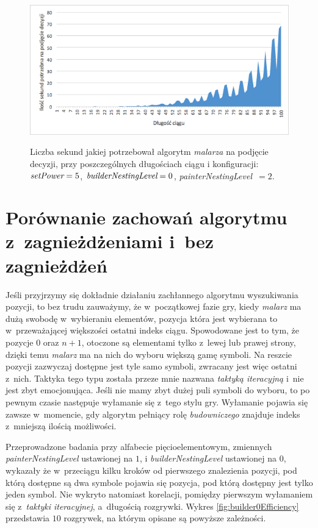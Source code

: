 \documentclass[document]{xmgr}
\begin{document}
\begin{figure}[tbh]
    \centering
    \caption{Liczba sekund jakiej potrzebował algorytm \emph{malarza} na podjęcie decyzji, przy poszczególnych długościach ciągu i konfiguracji: $\emph{setPower}=5$, $\emph{builderNestingLevel}=0$, \emph{painterNestingLevel}~$=2$.}
    \includegraphics[width = \textwidth]{images2/timePainter2Builder0}
    \label{fig:painter2builder0}
\end{figure}




\section{Porównanie zachowań algorytmu z~zagnieżdżeniami i~bez zagnieżdżeń}
Jeśli przyjrzymy się dokładnie działaniu zachłannego algorytmu wyszukiwania pozycji, to bez trudu zauważymy, że w~początkowej fazie gry, kiedy \emph{malarz} ma dużą swobodę w~wybieraniu elementów, pozycja która jest wybierana to w~przeważającej większości ostatni indeks ciągu. Spowodowane jest to tym, że pozycje $0$ oraz $n+1$, otoczone są elementami tylko z~lewej lub prawej strony, dzięki temu \emph{malarz} ma na nich do wyboru większą gamę symboli. Na reszcie pozycji zazwyczaj dostępne jest tyle samo symboli, zwracany jest więc ostatni z~nich. Taktyka tego typu została przeze mnie nazwana \emph{taktyką iteracyjną} i~nie jest zbyt emocjonująca. Jeśli nie mamy zbyt dużej puli symboli do wyboru, to po pewnym czasie następuje wyłamanie się z~tego stylu gry. Wyłamanie pojawia się zawsze w~momencie, gdy algorytm pełniący rolę \emph{budowniczego} znajduje indeks z~mniejszą ilością możliwości. 

Przeprowadzone badania przy alfabecie pięcioelementowym, zmiennych \emph{painterNestingLevel} ustawionej na $1$, i \emph{builderNestingLevel} ustawionej na $0$, wykazały że w~przeciągu kilku kroków od pierwszego znalezienia pozycji, pod którą dostępne są dwa symbole pojawia się pozycja, pod którą dostępny jest tylko jeden symbol. Nie wykryto natomiast korelacji, pomiędzy pierwszym wyłamaniem się z~\emph{taktyki iteracyjnej}, a~długością rozgrywki. Wykres \ref{fig:builder0Efficiency} przedstawia $10$ rozgrywek, na którym opisane są powyższe zależności.
 
\end{document}
